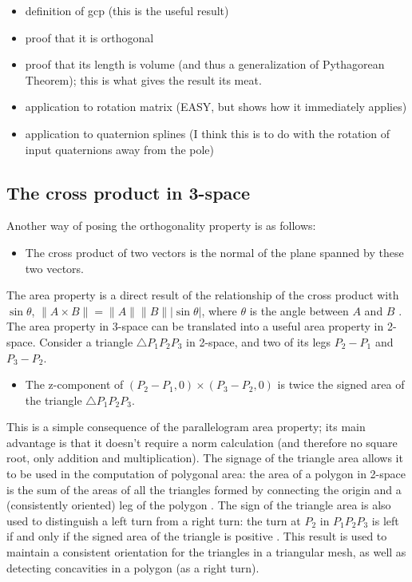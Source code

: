 \documentclass[10pt]{article}
\begin{document}
\begin{itemize}
\item definition of gcp (this is the useful result)
\item proof that it is orthogonal
\item proof that its length is volume (and thus a generalization of Pythagorean Theorem);
      this is what gives the result its meat.
\item application to rotation matrix (EASY, but shows how it immediately applies)
\item application to quaternion splines (I think this is to do with the rotation of 
      input quaternions away from the pole)
\end{itemize}

\clearpage

\subsection{The cross product in 3-space}

Another way of posing the orthogonality property is as follows:
\begin{itemize}
\item The cross product of two vectors is the normal of the plane spanned by these two vectors.
\end{itemize}
The area property is a direct result of the relationship of the cross product with
$\sin\theta$, $\|A \times B\| = \|A\| \|B\| |\sin\theta|$, 
where $\theta$ is the angle between $A$ and $B$ \cite{lang71}. %
The area property in 3-space can be translated into a useful area property
in 2-space.
Consider a triangle $\bigtriangleup P_1P_2P_3$ in 2-space, 
and two of its legs $P_2 - P_1$ and $P_3 - P_2$.
\begin{itemize}
\item The z-component of $(P_2 - P_1, 0) \times (P_3 - P_2, 0)$ is twice the signed area
of the triangle $\bigtriangleup P_1P_2P_3$.
\end{itemize}
This is a simple consequence of the parallelogram area property;
its main advantage is that it doesn't require a norm calculation (and therefore no square root,
only addition and multiplication).
%
The signage of the triangle area allows it to be used in the computation of polygonal area:
the area of a polygon in 2-space is the sum of the areas of all the triangles formed by 
connecting the origin and a (consistently oriented) leg of the polygon \cite{orourke94}.
The sign of the triangle area is also used to distinguish a left turn from a right turn:
the turn at $P_2$ in $P_1P_2P_3$ is left if and only if the signed area of the triangle is positive
\cite{orourke94}.%
This result is used to maintain a consistent orientation for the triangles in a triangular mesh,
as well as detecting concavities in a polygon (as a right turn).
\end{document}
